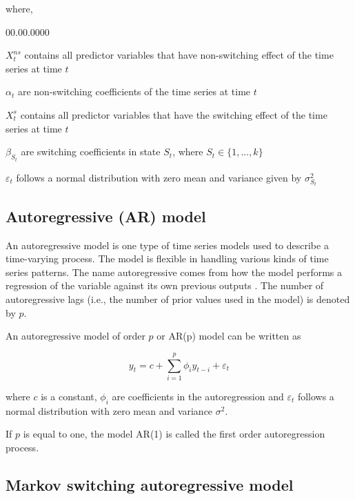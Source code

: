 where, 
\begin{labeling}{00.00.0000}
\item [{$X_{t}^{ns}$}] contains all predictor variables that have non-switching
effect of the time series at time $t$
\item [{$\alpha_{t}$}] are non-switching coefficients of the time series
at time $t$
\item [{$X_{t}^{s}$}] contains all predictor variables that have the switching
effect of the time series at time $t$
\item [{$\beta_{S_{t}}$}] are switching coefficients in state $S_{t}$,
where $S_{t}\in\{1,...,k\}$
\item [{$\varepsilon_{t}$}] follows a normal distribution with zero mean
and variance given by $\sigma_{S_{t}}^{2}$ 
\end{labeling}

\subsection{Autoregressive (AR) model}

An autoregressive model is one type of time series models used to
describe a time-varying process. The model is flexible in handling
various kinds of time series patterns. The name autoregressive comes
from how the model performs a regression of the variable against its
own previous outputs \citep{cryer1986time}. The number of autoregressive
lags (i.e., the number of prior values used in the model) is denoted
by $p$. 
\begin{defn}
An autoregressive model of order $p$ or AR(p) model can be written
as 

\[
y_{t}=c+\sum_{i=1}^{p}\phi_{i}y_{t-i}+\varepsilon_{t}
\]

where $c$ is a constant, $\phi_{i}$ are coefficients in the autoregression
and $\varepsilon_{t}$ follows a normal distribution with zero mean
and variance $\sigma^{2}$.
\end{defn}
If $p$ is equal to one, the model AR(1) is called the first order
autoregression process.

\subsection{Markov switching autoregressive model}

